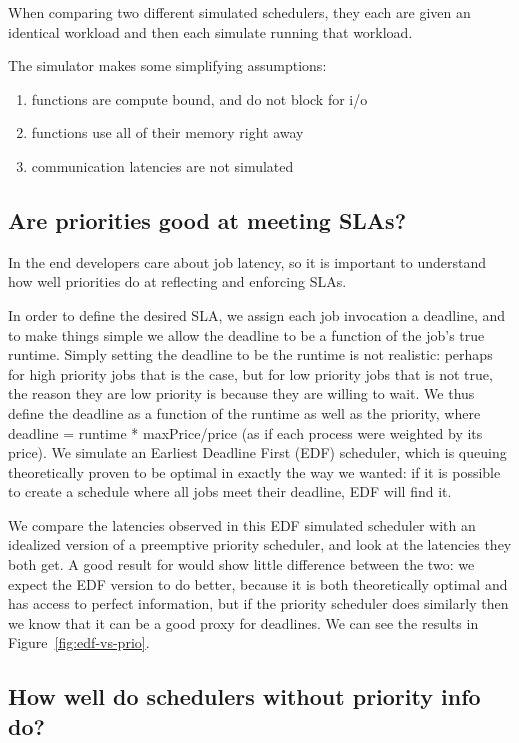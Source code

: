 When comparing two different simulated schedulers, they each are given an
identical workload and then each simulate running that workload.

The simulator makes some simplifying assumptions:
\begin{enumerate}
    \item functions are compute bound, and do not block for i/o
    \item functions use all of their memory right away
    \item communication latencies are not simulated
\end{enumerate}

\subsection{Are priorities good at meeting SLAs?}

In the end developers care about job latency, so it is important to understand
how well priorities do at reflecting and enforcing SLAs.

In order to define the desired SLA, we assign each job invocation a deadline,
and to make things simple we allow the deadline to be a function of the job's
true runtime. Simply setting the deadline to be the runtime is not realistic:
perhaps for high priority jobs that is the case, but for low priority jobs that
is not true, the reason they are low priority is because they are willing to
wait. We thus define the deadline as a function of the runtime as well as the
priority, where deadline = runtime * maxPrice/price (as if each process were
weighted by its price). We simulate an Earliest Deadline First (EDF) scheduler,
which is queuing theoretically proven to be optimal in exactly the way we
wanted: if it is possible to create a schedule where all jobs meet their
deadline, EDF will find it\cite{TODO}.

We compare the latencies observed in this EDF simulated scheduler with an
idealized version of a preemptive priority scheduler, and look at the latencies
they both get. A good result for \sys{} would show little difference between the
two: we expect the EDF version to do better, because it is both theoretically
optimal and has access to perfect information, but if the priority scheduler
does similarly then we know that it can be a good proxy for deadlines. We can
see the results in Figure~\ref{fig:edf-vs-prio}.

\subsection{How well do schedulers without priority info do?}

